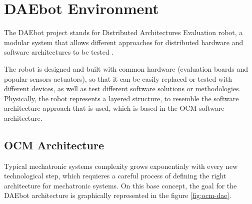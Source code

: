 %  
%  
%  
%  
%  
%  

\chapter{DAEbot Environment} \label{chapter1}

The DAEbot project stands for Distributed Architectures Evaluation robot, a modular system that
allows different approaches for distributed hardware and software architectures to be tested
\cite{Wiki}.

The robot is designed and built with common hardware (evaluation boards and popular
sensors-actuators), so that it can be easily replaced or tested with different devices, as well as
test different software solutions or methodologies. Physically, the robot represents a layered
structure, to resemble the software architecture approach that is used, which is based in the OCM
software architecture.

\section{OCM Architecture}

Typical mechatronic systems complexity grows exponentialy with every new technological step, which
requieres a careful process of defining the right architecture for mechatronic systems. On this base
concept, the goal for the DAEbot architecture is graphically represented in the figure
\ref{fig:ocm-dae}.

